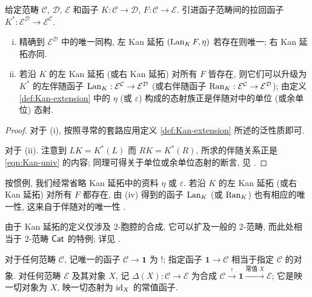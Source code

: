 \begin{proposition}\label{prop:Kan-uniqueness}
	给定范畴 $\mathcal{C}$, $\mathcal{D}$, $\mathcal{E}$ 和函子 $K: \mathcal{C} \to \mathcal{D}$, $F: \mathcal{C} \to \mathcal{E}$. 引进函子范畴间的拉回函子 $K^*: \mathcal{E}^{\mathcal{D}} \to \mathcal{E}^{\mathcal{C}}$.
	\begin{enumerate}[(i)]
		\item 精确到 $\mathcal{E}^{\mathcal{D}}$ 中的唯一同构, 左 Kan 延拓 $(\operatorname{Lan}_K F, \eta)$ 若存在则唯一; 右 Kan 延拓亦同.
		\item 若沿 $K$ 的左 Kan 延拓 (或右 Kan 延拓) 对所有 $F$ 皆存在, 则它们可以升级为 $K^*$ 的左伴随函子 $\operatorname{Lan}_K: \mathcal{E}^{\mathcal{C}} \to \mathcal{E}^{\mathcal{D}}$ (或右伴随函子 $\operatorname{Ran}_K: \mathcal{E}^{\mathcal{C}} \to \mathcal{E}^{\mathcal{D}}$); 由定义 \ref{def:Kan-extension} 中的 $\eta$ (或 $\varepsilon$) 构成的态射族正是伴随对中的单位 (或余单位) 态射.
	\end{enumerate}
\end{proposition}
\begin{proof}
	对于 (i), 按照寻常的套路应用定义 \ref{def:Kan-extension} 所述的泛性质即可.

	对于 (ii). 注意到 $LK = K^*(L)$ 而 $RK = K^*(R)$, 所求的伴随关系正是 \eqref{eqn:Kan-univ} 的内容; 同理可得关于单位或余单位态射的断言, 见 \cite[命题 2.6.5]{Li1}.
\end{proof}

按惯例, 我们经常省略 Kan 延拓中的资料 $\eta$ 或 $\varepsilon$. 若沿 $K$ 的左 Kan 延拓 (或右 Kan 延拓) 对所有 $F$ 都存在, 由 (iv) 得到的函子 $\operatorname{Lan}_K$ (或 $\operatorname{Ran}_K$) 也有相应的唯一性, 这来自于伴随对的唯一性 \cite[命题 2.6.10]{Li1}.

\begin{remark}
	由于 Kan 延拓的定义仅涉及 $2$-胞腔的合成, 它可以扩及一般的 $2$-范畴, 而此处相当于 $2$-范畴 $\mathsf{Cat}$ 的特例; 详见 \cite[\S 3.5]{Li1}.
\end{remark}

对于任何范畴 $\mathcal{C}$, 记唯一的函子 $\mathcal{C} \to \mathbf{1}$ 为 $!$; 指定函子 $\mathbf{1} \to \mathcal{C}$ 相当于指定 $\mathcal{C}$ 的对象. 对任何范畴 $\mathcal{E}$ 及其对象 $X$, 记 $\Delta(X): \mathcal{C} \to \mathcal{E}$ 为合成 $\mathcal{C} \xrightarrow{!} \mathbf{1} \xrightarrow{\text{常值}\; X} \mathcal{E}$; 它是映一切对象为 $X$, 映一切态射为 $\mathrm{id}_X$ 的常值函子.

